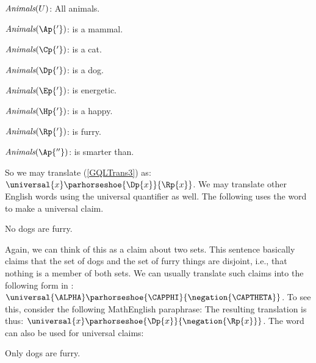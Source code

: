 \begin{description}[itemsep=0em]
	\item[Animals model:] \hfill{} 
	\begin{description}[itemsep=0em]
		\item[] $\emph{Animals}(U)$: All animals.
		\item[] $\emph{Animals}(\Ap{'})$: is a mammal.
		\item[] $\emph{Animals}(\Cp{'})$: is a cat.
		\item[] $\emph{Animals}(\Dp{'})$: is a dog.
		\item[] $\emph{Animals}(\Ep{'})$: is energetic.
		\item[] $\emph{Animals}(\Hp{'})$: is a happy.
		\item[] $\emph{Animals}(\Rp{'})$: is furry.
		\item[] $\emph{Animals}(\Ap{''})$: is smarter than.
	\end{description}
\end{description}

\noindent{}So we may translate (\ref{GQLTrans3}) as: $\universal{\variable{x}}\parhorseshoe{\Dp{\variable{x}}}{\Rp{\variable{x}}}$.  We may translate other English words using the universal quantifier as well.  The following uses the word  to make a universal claim.

\begin{menumerate}
	\item\label{GQLTrans4} No dogs are furry.
\end{menumerate}

\noindent{}Again, we can think of this as a claim about two sets.  This sentence basically claims that the set of dogs and the set of furry things are disjoint, i.e., that nothing is a member of both sets.  We can usually translate such claims into the following form in \GQL{}: $\universal{\ALPHA}\parhorseshoe{\CAPPHI}{\negation{\CAPTHETA}}$.  To see this, consider the following MathEnglish paraphrase:   The resulting translation is thus:  $\universal{\variable{x}}\parhorseshoe{\Dp{\variable{x}}}{\negation{\Rp{\variable{x}}}}$.  The word  can also be used for universal claims:

\begin{menumerate}
	\item\label{GQLTrans5} Only dogs are furry.
\end{menumerate}

